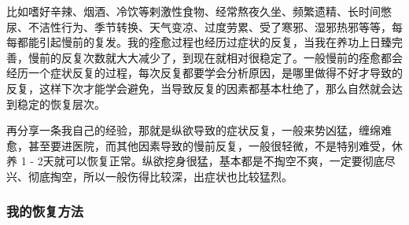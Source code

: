\documentclass{ctexart}
\begin{document}
比如嗜好辛辣、烟酒、冷饮等剌激性食物、经常熬夜久坐、频繁遗精、长时间憋尿、不洁性行为、季节转换、天气变凉、过度劳累、受了寒邪、湿邪热邪等等，每每都能引起慢前的复发。我的痊愈过程也经历过症状的反复，当我在养功上日臻完善，慢前的反复次数就大大减少了，到现在就相对很稳定了。一般慢前的痊愈都会经历一个症状反复的过程，每次反复都要学会分析原因，是哪里做得不好才导致的反复，这样下次才能学会避免，当导致反复的因素都基本杜绝了，那么自然就会达到稳定的恢复层次。

再分享一条我自己的经验，那就是纵欲导致的症状反复，一般来势凶猛，缠绵难愈，甚至要进医院，而其他因素导致的慢前反复，一般很轻微，不是特别难受，休养 1 - 2天就可以恢复正常。纵欲挖身很猛，基本都是不掏空不爽，一定要彻底尽兴、彻底掏空，所以一般伤得比较深，出症状也比较猛烈。

\subsubsection{我的恢复方法}
\end{document}
